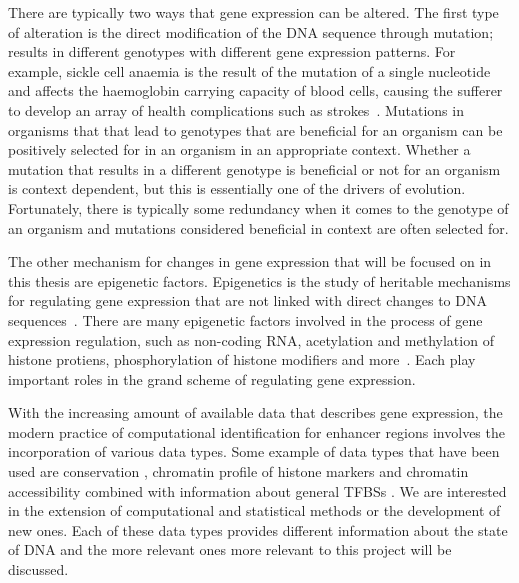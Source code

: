         There are typically two ways that gene expression can be altered.
        The first type of alteration is the direct modification of the DNA sequence through mutation; results in different genotypes with different gene expression patterns.
        For example, sickle cell anaemia is the result of the mutation of a single nucleotide and affects the haemoglobin carrying capacity of blood cells, causing the sufferer to develop an array of health complications such as strokes~\cite{clancy2008dna}. 
        Mutations in organisms that that lead to genotypes that are beneficial for an organism can be positively selected for in an organism in an appropriate context. Whether a mutation that results in a different genotype is beneficial or not for an organism is context dependent, but this is essentially one of the drivers of evolution. Fortunately, there is typically some redundancy when it comes to the genotype of an organism and mutations considered beneficial in context are often selected for.
        
        The other mechanism for changes in gene expression that will be focused on in this thesis are epigenetic factors. Epigenetics is the study of heritable mechanisms for regulating gene expression that are not linked with direct changes to DNA sequences~\cite{holliday2006epigenetics}. There are many epigenetic factors involved in the process of gene expression regulation, such as non-coding RNA, acetylation and methylation of histone protiens, phosphorylation of histone modifiers and more~\cite{geiman2002chromatin, jaenisch2003epigenetic, holoch2015rna, waterland2003transposable}. Each play important roles in the grand scheme of regulating gene expression. 
        
        With the increasing amount of available data that describes gene expression, the modern practice of computational identification for enhancer regions involves the incorporation of various data types. Some example of data types that have been used are conservation \cite{visel2007enhancer}, chromatin profile of histone markers \cite{won2010genome} and chromatin accessibility combined with information about general TFBSs \cite{boyle2010high}. We are interested in the extension of computational and statistical methods or the development of new ones. Each of these data types provides different information about the state of DNA and the more relevant ones more relevant to this project will be discussed. 
        
